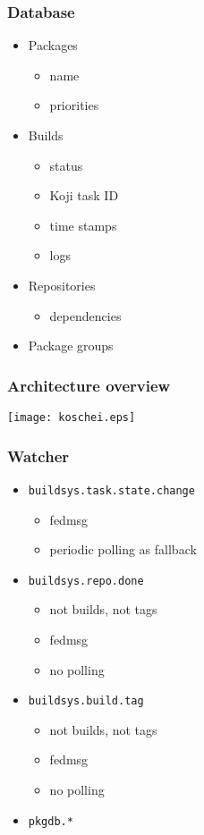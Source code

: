 \documentclass[pdftex,unicode,xcolor=table]{beamer}
\begin{document}
\begin{frame}
  \frametitle{Database}
  \begin{itemize}
    \item Packages
    \begin{itemize}
      \item name
      \item priorities
    \end{itemize}
    \item Builds
    \begin{itemize}
      \item status
      \item Koji task ID
      \item time stamps
      \item logs
    \end{itemize}
    \item Repositories
    \begin{itemize}
      \item dependencies
    \end{itemize}
    \item Package groups
  \end{itemize}
\end{frame}

\begin{frame}[fragile]
  \frametitle{Architecture overview}
  \begin{center}
    \texttt{[image: koschei.eps]}
  \end{center}
\end{frame}

\begin{frame}
  \frametitle{Watcher}
  \begin{itemize}
    \item \tt{buildsys.task.state.change}
    \begin{itemize}
      \item fedmsg
      \item periodic polling as fallback
    \end{itemize}
    \item \tt{buildsys.repo.done}
    \begin{itemize}
      \item not builds, not tags
      \item fedmsg
      \item no polling
    \end{itemize}
    \item \tt{buildsys.build.tag}
    \begin{itemize}
      \item not builds, not tags
      \item fedmsg
      \item no polling
    \end{itemize}
    \item \tt{pkgdb.*}
  \end{itemize}
\end{frame}
\end{document}

